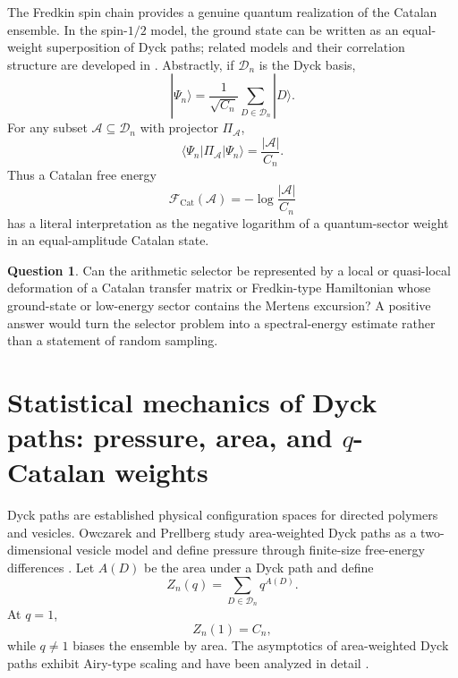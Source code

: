 \documentclass[11pt]{amsart}
\numberwithin{equation}{section}
\theoremstyle{plain}
\theoremstyle{definition}
\newtheorem{question}[theorem]{Question}
\theoremstyle{remark}
\newcommand{\Cat}{C}
\newcommand{\D}{\mathcal{D}}
\newcommand{\Fcat}{\mathcal{F}_{\mathrm{Cat}}}
\begin{document}
The Fredkin spin chain provides a genuine quantum realization of the Catalan ensemble.  In the spin-$1/2$ model, the ground state can be written as an equal-weight superposition of Dyck paths; related models and their correlation structure are developed in \cite{DellAnnaEtAl2016,SalbergerKorepin2017}.  Abstractly, if $\D_n$ is the Dyck basis,
\begin{equation}
|\Psi_n\rangle
=
\frac{1}{\sqrt{\Cat_n}}
\sum_{D\in\D_n}|D\rangle.
\label{eq:fredkin_catalan_state}
\end{equation}
For any subset $\mathcal{A}\subseteq\D_n$ with projector $\Pi_{\mathcal A}$,
\begin{equation}
\langle\Psi_n|\Pi_{\mathcal A}|\Psi_n\rangle
=
\frac{|\mathcal A|}{\Cat_n}.
\label{eq:sector_weight_quantum}
\end{equation}
Thus a Catalan free energy
\begin{equation}
\Fcat(\mathcal A)
=
-\log\frac{|\mathcal A|}{\Cat_n}
\label{eq:catalan_free_energy_sector}
\end{equation}
has a literal interpretation as the negative logarithm of a quantum-sector weight in an equal-amplitude Catalan state.

\begin{question}
\label{question:arithmetic_hamiltonian}
Can the arithmetic selector be represented by a local or quasi-local deformation of a Catalan transfer matrix or Fredkin-type Hamiltonian whose ground-state or low-energy sector contains the Mertens excursion?  A positive answer would turn the selector problem into a spectral-energy estimate rather than a statement of random sampling.
\end{question}

\section{Statistical mechanics of Dyck paths: pressure, area, and $q$-Catalan weights}
\label{sec:dyck_statistical_mechanics}

Dyck paths are established physical configuration spaces for directed polymers and vesicles.  Owczarek and Prellberg study area-weighted Dyck paths as a two-dimensional vesicle model and define pressure through finite-size free-energy differences \cite{OwczarekPrellberg2014}.  Let $A(D)$ be the area under a Dyck path and define
\begin{equation}
Z_n(q)
=
\sum_{D\in\D_n} q^{A(D)}.
\label{eq:q_catalan_partition}
\end{equation}
At $q=1$,
\begin{equation}
Z_n(1)=\Cat_n,
\label{eq:q_catalan_at_one}
\end{equation}
while $q\ne1$ biases the ensemble by area.  The asymptotics of area-weighted Dyck paths exhibit Airy-type scaling and have been analyzed in detail \cite{HaugPrellberg2015}.
\end{document}
